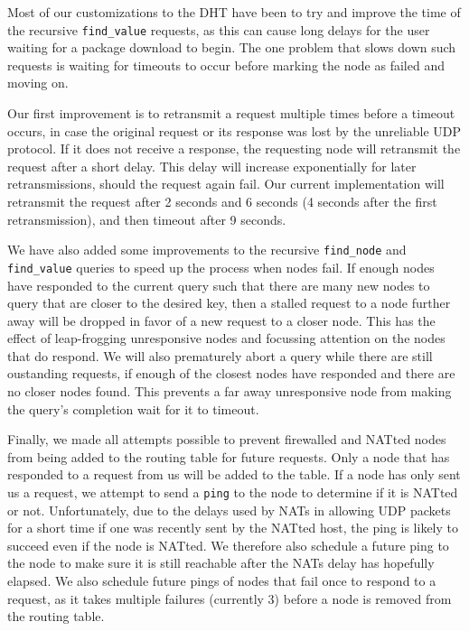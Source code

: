 \documentclass[conference]{IEEEtran}
\begin{document}
Most of our customizations to the DHT have been to try and improve
the time of the recursive \texttt{find\_value} requests, as this can
cause long delays for the user waiting for a package download to
begin. The one problem that slows down such requests is waiting for
timeouts to occur before marking the node as failed and moving on.

Our first improvement is to retransmit a request multiple times
before a timeout occurs, in case the original request or its
response was lost by the unreliable UDP protocol. If it does not
receive a response, the requesting node will retransmit the request
after a short delay. This delay will increase exponentially for
later retransmissions, should the request again fail. Our current
implementation will retransmit the request after 2 seconds and 6
seconds (4 seconds after the first retransmission), and then timeout
after 9 seconds.

We have also added some improvements to the recursive
\texttt{find\_node} and \texttt{find\_value} queries to speed up the
process when nodes fail. If enough nodes have responded to the
current query such that there are many new nodes to query that are
closer to the desired key, then a stalled request to a node further
away will be dropped in favor of a new request to a closer node.
This has the effect of leap-frogging unresponsive nodes and
focussing attention on the nodes that do respond. We will also
prematurely abort a query while there are still oustanding requests,
if enough of the closest nodes have responded and there are no
closer nodes found. This prevents a far away unresponsive node from
making the query's completion wait for it to timeout.

Finally, we made all attempts possible to prevent firewalled and
NATted nodes from being added to the routing table for future
requests. Only a node that has responded to a request from us will
be added to the table. If a node has only sent us a request, we
attempt to send a \texttt{ping} to the node to determine if it is
NATted or not. Unfortunately, due to the delays used by NATs in
allowing UDP packets for a short time if one was recently sent by
the NATted host, the ping is likely to succeed even if the node is
NATted. We therefore also schedule a future ping to the node to make
sure it is still reachable after the NATs delay has hopefully
elapsed. We also schedule future pings of nodes that fail once to
respond to a request, as it takes multiple failures (currently 3)
before a node is removed from the routing table.
\end{document}
